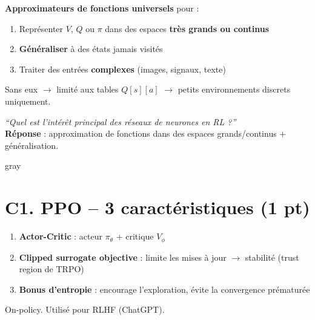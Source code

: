 \documentclass[11pt,a4paper]{article}
\begin{document}
\begin{formbox}
\textbf{Approximateurs de fonctions universels} pour :
\begin{enumerate}[nosep]
\item Représenter $V$, $Q$ ou $\pi$ dans des espaces \textbf{très grands ou continus}
\item \textbf{Généraliser} à des états jamais visités
\item Traiter des entrées \textbf{complexes} (images, signaux, texte)
\end{enumerate}
Sans eux $\to$ limité aux tables $Q[s][a]$ $\to$ petits environnements discrets uniquement.
\end{formbox}

\begin{exambox}
\textit{``Quel est l'intérêt principal des réseaux de neurones en RL ?''}\\[4pt]
\textbf{Réponse} : approximation de fonctions dans des espaces grands/continus + généralisation.
\end{exambox}

\newpage

\begin{tierbox}{gray}
\end{tierbox}

\section{C1. PPO -- 3 caractéristiques (1 pt)}

\begin{formbox}
\begin{enumerate}[nosep]
\item \textbf{Actor-Critic} : acteur $\pi_\theta$ + critique $V_\phi$
\item \textbf{Clipped surrogate objective} : limite les mises à jour $\to$ stabilité (trust region de TRPO)
\item \textbf{Bonus d'entropie} : encourage l'exploration, évite la convergence prématurée
\end{enumerate}
On-policy. Utilisé pour RLHF (ChatGPT).
\end{formbox}
\end{document}
